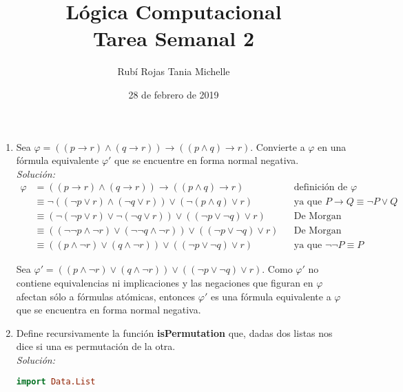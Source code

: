 \documentclass[letterpaper,11pt]{article}
\title{Lógica Computacional \\ Tarea Semanal 2}
\author{Rubí Rojas Tania Michelle}
\date{28 de febrero de 2019}
\begin{document}
\maketitle

\begin{enumerate}
   
   \item Sea $\varphi = ((p \rightarrow r) \land (q \rightarrow r)) 
   \rightarrow ((p \land q) \rightarrow r)$. Convierte a $\varphi$ en una
   fórmula equivalente $\varphi'$ que se encuentre en forma normal negativa.\\
   \textit{Solución:}
   \begin{align*}
      \varphi &= ((p \rightarrow r) \land (q \rightarrow r)) 
                 \rightarrow ((p \land q) \rightarrow r) 
              && \text{definición de $\varphi$} \\
              &\equiv \neg ((\neg p \lor r) \land (\neg q \lor r))
                      \lor (\neg (p \land q) \lor r)
              && \text{ya que $P \rightarrow Q \equiv \neg P \lor Q$} \\
              &\equiv (\neg (\neg p \lor r) \lor \neg (\neg q \lor r))
                      \lor ((\neg p \lor \neg q) \lor r)
              && \text{De Morgan} \\
              &\equiv ((\neg \neg p \land \neg r) \lor 
                      (\neg \neg q \land \neg r)) \lor 
                      ((\neg p \lor \neg q) \lor r)
              && \text{De Morgan} \\
              &\equiv ((p \land \neg r) \lor (q \land \neg r))
                      \lor ((\neg p \lor \neg q) \lor r)
              && \text{ya que $\neg \neg P \equiv P$}
   \end{align*}

   Sea $\varphi' = ((p \land \neg r) \lor (q \land \neg r)) \lor 
   ((\neg p \lor \neg q) \lor r)$. Como $\varphi'$ no contiene equivalencias ni 
   implicaciones y las negaciones que figuran en $\varphi$ afectan sólo a 
   fórmulas atómicas, entonces $\varphi'$ es una fórmula equivalente a 
   $\varphi$ que se encuentra en forma normal negativa.
    
   \item Define recursivamente la función \textbf{isPermutation} que, dadas
   dos listas nos dice si una es permutación de la otra.\\
   \textit{Solución:} 
   \begin{lstlisting}[language=Haskell]
      import Data.List


\end{lstlisting}
\end{enumerate}
\end{document}
